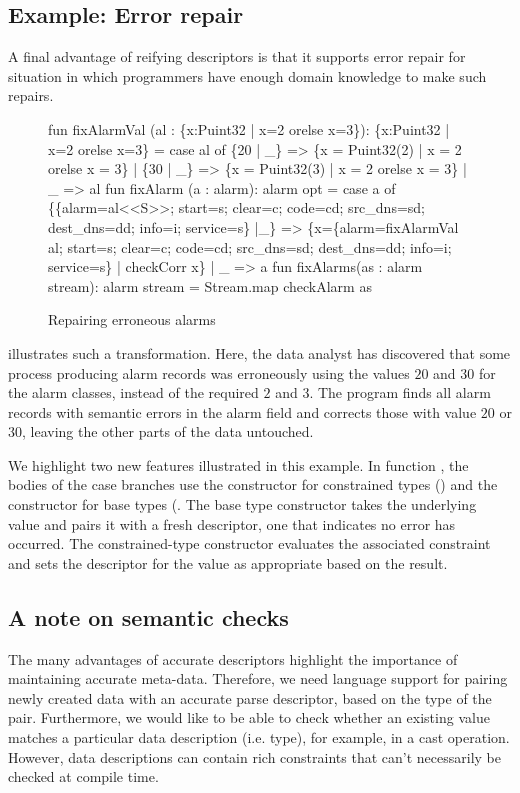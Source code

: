 \subsection{Example: Error repair}
A final advantage of reifying descriptors is that it supports error repair for situation in which programmers have enough domain knowledge to make such repairs.
\begin{figure}
  \centering
\begin{code}
fun fixAlarmVal (al : \{x:Puint32 | x=2 orelse x=3\}): 
  \{x:Puint32 | x=2 orelse x=3\} =
    case al of
      \{20 | _\} => \{x = Puint32(2) | x = 2 orelse x = 3\}
    | \{30 | _\} => \{x = Puint32(3) | x = 2 orelse x = 3\}
    | _ => al
\mbox{}
fun fixAlarm (a : alarm): alarm opt =
    case a of 
	\{\{alarm=al<<S>>; start=s; clear=c; 
          code=cd; src_dns=sd; dest_dns=dd; 
	  info=i; service=s\} |_\} 
          => \{x=\{alarm=fixAlarmVal al; 
                 start=s; clear=c; 
                 code=cd; src_dns=sd; dest_dns=dd; 
                 info=i; service=s\}
              | checkCorr x\} 
      | _ => a
\mbox{}
fun fixAlarms(as : alarm stream): alarm stream =
    Stream.map checkAlarm as
\end{code}
  \caption{Repairing erroneous alarms}
  \label{fig:ex-error-repair}
\end{figure}


 illustrates such a transformation.
Here, the data analyst
has discovered that some process producing alarm records was
erroneously using the values $20$ and $30$ for the alarm classes,
instead of the required $2$ and $3$. The program finds all alarm
records with semantic errors in the alarm field and corrects those
with value $20$ or $30$, leaving the other parts of the data untouched. 

We highlight two new \datatype{} features illustrated in this example. In function , the bodies of the case
branches use the constructor for constrained types () and the
constructor for base types (.  The base type constructor takes the underlying value and pairs it with a fresh descriptor, one that indicates no error has occurred.  The constrained-type constructor evaluates the associated constraint and sets the descriptor for the value as appropriate based on the result.


\subsection{A note on semantic checks}
The many advantages of accurate descriptors highlight the
importance of maintaining accurate meta-data. Therefore, we need
language support for pairing newly created data with an accurate parse
descriptor, based on the type of the pair. Furthermore, we would like
to be able to check whether an existing value matches a particular
data description (i.e. type), for example, in a cast operation.
However, data descriptions can contain rich constraints that can't
necessarily be checked at compile time.

